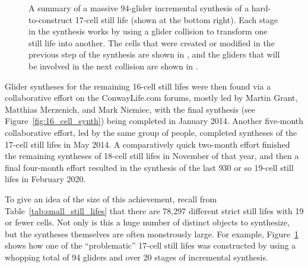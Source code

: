 \begin{figure}[!htb]
	
	\caption{A summary of a massive $94$-glider incremental synthesis of a hard-to-construct 17-cell still life (shown at the bottom right). Each stage in the synthesis works by using a glider collision to transform one still life into another. The cells that were created or modified in the previous step of the synthesis are shown in , and the gliders that will be involved in the next collision are shown in .}\label{fig:17_cell_synthesis}
\end{figure}

Glider syntheses for the remaining 16-cell still lifes were then found via a collaborative effort on the ConwayLife.com forums, mostly led by Martin Grant, Matthias Merzenich, and Mark Niemiec, with the final synthesis (see Figure~\ref{fig:16_cell_synth}) being completed in January 2014. Another five-month collaborative effort, led by the same group of people, completed syntheses of the 17-cell still lifes in May 2014. A comparatively quick two-month effort finished the remaining syntheses of 18-cell still lifes in November of that year, and then a final four-month effort resulted in the synthesis of the last $930$ or so 19-cell still lifes in February 2020.

To give an idea of the size of this achievement, recall from Table~\ref{tab:small_still_lifes} that there are 78,297 different strict still lifes with 19 or fewer cells. Not only is this a huge number of distinct objects to synthesize, but the syntheses themselves are often monstrously large. For example, Figure~\ref{fig:17_cell_synthesis} shows how one of the ``problematic'' 17-cell still lifes was constructed by using a whopping total of 94 gliders and over 20 stages of incremental synthesis.

